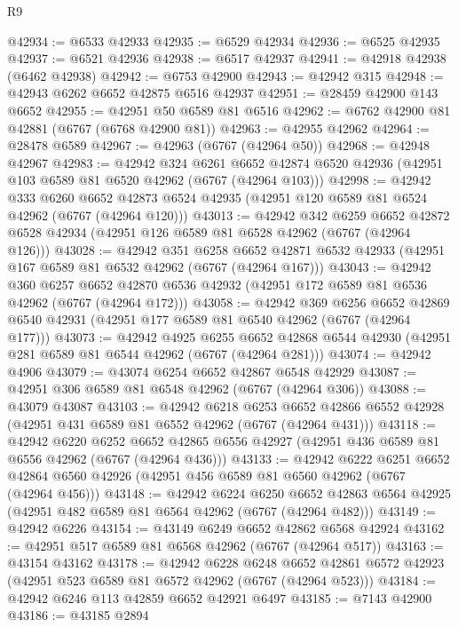 \begin{lexlean}{R9}
\begin{coremodule}
@42934 := @6533 @42933
@42935 := @6529 @42934
@42936 := @6525 @42935
@42937 := @6521 @42936
@42938 := @6517 @42937
@42941 := @42918 @42938 (@6462 @42938)
@42942 := @6753 @42900
@42943 := @42942 @315
@42948 := @42943 @6262 @6652 @42875 @6516 @42937
@42951 := @28459 @42900 @143 @6652
@42955 := @42951 @50 @6589 @81 @6516
@42962 := @6762 @42900 @81 @42881 (@6767 (@6768 @42900 @81))
@42963 := @42955 @42962
@42964 := @28478 @6589
@42967 := @42963 (@6767 (@42964 @50))
@42968 := @42948 @42967
@42983 := @42942
    @324
    @6261
    @6652
    @42874
    @6520
    @42936
    (@42951 @103 @6589 @81 @6520 @42962 (@6767 (@42964 @103)))
@42998 := @42942
    @333
    @6260
    @6652
    @42873
    @6524
    @42935
    (@42951 @120 @6589 @81 @6524 @42962 (@6767 (@42964 @120)))
@43013 := @42942
    @342
    @6259
    @6652
    @42872
    @6528
    @42934
    (@42951 @126 @6589 @81 @6528 @42962 (@6767 (@42964 @126)))
@43028 := @42942
    @351
    @6258
    @6652
    @42871
    @6532
    @42933
    (@42951 @167 @6589 @81 @6532 @42962 (@6767 (@42964 @167)))
@43043 := @42942
    @360
    @6257
    @6652
    @42870
    @6536
    @42932
    (@42951 @172 @6589 @81 @6536 @42962 (@6767 (@42964 @172)))
@43058 := @42942
    @369
    @6256
    @6652
    @42869
    @6540
    @42931
    (@42951 @177 @6589 @81 @6540 @42962 (@6767 (@42964 @177)))
@43073 := @42942
    @4925
    @6255
    @6652
    @42868
    @6544
    @42930
    (@42951 @281 @6589 @81 @6544 @42962 (@6767 (@42964 @281)))
@43074 := @42942 @4906
@43079 := @43074 @6254 @6652 @42867 @6548 @42929
@43087 := @42951 @306 @6589 @81 @6548 @42962 (@6767 (@42964 @306))
@43088 := @43079 @43087
@43103 := @42942
    @6218
    @6253
    @6652
    @42866
    @6552
    @42928
    (@42951 @431 @6589 @81 @6552 @42962 (@6767 (@42964 @431)))
@43118 := @42942
    @6220
    @6252
    @6652
    @42865
    @6556
    @42927
    (@42951 @436 @6589 @81 @6556 @42962 (@6767 (@42964 @436)))
@43133 := @42942
    @6222
    @6251
    @6652
    @42864
    @6560
    @42926
    (@42951 @456 @6589 @81 @6560 @42962 (@6767 (@42964 @456)))
@43148 := @42942
    @6224
    @6250
    @6652
    @42863
    @6564
    @42925
    (@42951 @482 @6589 @81 @6564 @42962 (@6767 (@42964 @482)))
@43149 := @42942 @6226
@43154 := @43149 @6249 @6652 @42862 @6568 @42924
@43162 := @42951 @517 @6589 @81 @6568 @42962 (@6767 (@42964 @517))
@43163 := @43154 @43162
@43178 := @42942
    @6228
    @6248
    @6652
    @42861
    @6572
    @42923
    (@42951 @523 @6589 @81 @6572 @42962 (@6767 (@42964 @523)))
@43184 := @42942 @6246 @113 @42859 @6652 @42921 @6497
@43185 := @7143 @42900
@43186 := @43185 @2894

\end{coremodule}
\end{lexlean}
